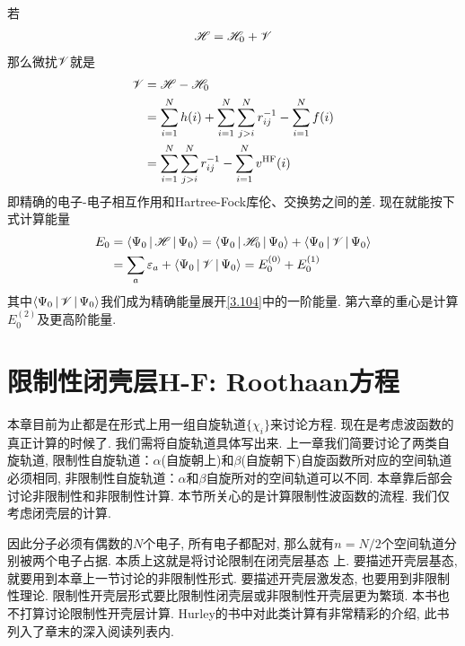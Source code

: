 若
\begin{align}\label{3.107}
	\mathscr{H} = \mathscr{H}_0 + \mathscr{V}
\end{align}
那么微扰$\mathscr{V}$就是
\begin{align}
	\mathscr{V} & = \mathscr{H} -\mathscr{H}_0\notag\\
	& = \sum_{i=1}^{N}h(i) + \sum_{i=1}^{N}\sum_{j>i}^{N}r_{ij}^{-1} - \sum_{i=1}^{N}f(i)\notag\\
	& = \sum_{i=1}^{N}\sum_{j>i}^{N}r_{ij}^{-1} - \sum_{i=1}^{N}v^\mathrm{HF}(i)
	\label{3.108}
\end{align}
即精确的电子-电子相互作用和Hartree-Fock库伦、交换势之间的差. 
现在就能按下式计算\hft 能量
\begin{align}\label{3.109}
	E_0 & = \Braket{\Psi_0|\mathscr{H}|\Psi_0} = \Braket{\Psi_0|\mathscr{H}_0|\Psi_0} + \Braket{\Psi_0|\mathscr{V}|\Psi_0} \notag\\
	& = \sum_a\varepsilon_a + \Braket{\Psi_0|\mathscr{V}|\Psi_0} = E_0^{(0)} + E_0^{(1)}
\end{align}
其中$\Braket{\Psi_0|\mathscr{V}|\Psi_0}$我们成为精确能量展开\autoref{3.104}中的一阶能量. 
第六章的重心是计算$E_0^{(2)}$及更高阶能量.

\section{限制性闭壳层H-F: Roothaan方程}
本章目前为止都是在形式上用一组自旋轨道$\{\chi_i\}$来讨论\hft 方程. 
现在是考虑\hft 波函数的真正计算的时候了. 
我们需将自旋轨道具体写出来. 
上一章我们简要讨论了两类自旋轨道, 
限制性自旋轨道：$\alpha$(自旋朝上)和$\beta$(自旋朝下)自旋函数所对应的空间轨道必须相同, 
非限制性自旋轨道：$\alpha$和$\beta$自旋所对的空间轨道可以不同. 
本章靠后部会讨论非限制性\hft 和非限制性\hft 计算. 
本节所关心的是计算限制性\hft 波函数的流程. 
我们仅考虑闭壳层的计算.

因此分子必须有偶数的$N$个电子, 所有电子都配对, 那么就有$n=N/2$个空间轨道分别被两个电子占据. 本质上这就是将讨论限制在闭壳层基态
上. 
要描述开壳层基态, 就要用到本章上一节讨论的非限制性形式. 
要描述开壳层激发态, 也要用到非限制性\hft 理论. 
限制性开壳层形式要比限制性闭壳层或非限制性开壳层更为繁琐. 
本书也不打算讨论限制性开壳层\hft 计算. 
Hurley的书中对此类计算有非常精彩的介绍, 此书列入了章末的深入阅读列表内.
